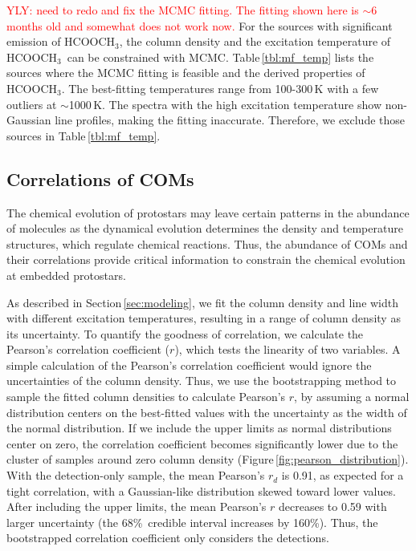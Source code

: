 \documentclass[twocolumn]{aastex62}
\newcommand{\methylformate}{\mbox{HCOOCH$_{3}$}}
\begin{document}
\textcolor{red}{YLY: need to redo and fix the MCMC fitting.  The fitting shown here is $\sim$6 months old and somewhat does not work now.}  For the sources with significant emission of \methylformate, the column density and the excitation temperature of \methylformate\ can be constrained with MCMC.  Table\,\ref{tbl:mf_temp} lists the sources where the MCMC fitting is feasible and the derived properties of \methylformate.  The best-fitting temperatures range from 100-300\,K with a few outliers at $\sim$1000\,K.  The spectra with the high excitation temperature show non-Gaussian line profiles, making the fitting inaccurate.  Therefore, we exclude those sources in Table\,\ref{tbl:mf_temp}.




\subsection{Correlations of COMs}
The chemical evolution of protostars may leave certain patterns in the abundance of molecules as the dynamical evolution determines the density and temperature structures, which regulate chemical reactions.  Thus, the abundance of COMs and their correlations provide critical information to constrain the chemical evolution at embedded protostars.

As described in Section\,\ref{sec:modeling}, we fit the column density and line width with different excitation temperatures, resulting in a range of column density as its uncertainty.  To quantify the goodness of correlation, we calculate the Pearson's correlation coefficient ($r$), which tests the linearity of two variables.  A simple calculation of the Pearson's correlation coefficient would ignore the uncertainties of the column density.  Thus, we use the bootstrapping method to sample the fitted column densities to calculate Pearson's $r$, by assuming a normal distribution centers on the best-fitted values with the uncertainty as the width of the normal distribution.  If we include the upper limits as normal distributions center on zero, the correlation coefficient becomes significantly lower due to the cluster of samples around zero column density (Figure\,\ref{fig:pearson_distribution}).  With the detection-only sample, the mean Pearson's $r_{d}$ is 0.91, as expected for a tight correlation, with a Gaussian-like distribution skewed toward lower values.  After including the upper limits, the mean Pearson's $r$ decreases to 0.59 with larger uncertainty (the 68\%\ credible interval increases by 160\%).  Thus, the bootstrapped correlation coefficient only considers the detections.
\end{document}
